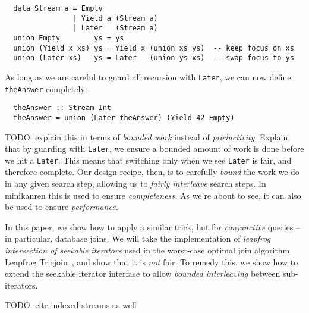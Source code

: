 \documentclass[acmsmall,screen,review,anonymous,dvipsnames]{acmart}
\newcommand\todo[1]{{\color{Orange}#1}}
\begin{document}

\begin{verbatim}
  data Stream a = Empty
                | Yield a (Stream a)
                | Later   (Stream a)
  union Empty        ys = ys
  union (Yield x xs) ys = Yield x (union xs ys)  -- keep focus on xs
  union (Later xs)   ys = Later   (union ys xs)  -- swap focus to ys
\end{verbatim}

\noindent
As long as we are careful to guard all recursion with \texttt{Later}, we can now define \texttt{theAnswer} completely:

\begin{verbatim}
  theAnswer :: Stream Int
  theAnswer = union (Later theAnswer) (Yield 42 Empty)
\end{verbatim}

\noindent
\todo{%
  TODO: explain this in terms of \emph{bounded work} instead of \emph{productivity}.
  Explain that by guarding with \texttt{Later}, we ensure a bounded amount of work is done before we hit a \texttt{Later}.
  This means that switching only when we see \texttt{Later} is fair, and therefore complete.
  Our design recipe, then, is to carefully \emph{bound} the work we do in any given search step, allowing us to \emph{fairly interleave} search steps.
  In minikanren this is used to ensure \emph{completeness.}
  As we're about to see, it can also be used to ensure \emph{performance.}
}


In this paper, we show how to apply a similar trick, but for \emph{conjunctive} queries -- in particular, database joins.
We will take the implementation of \emph{leapfrog intersection of seekable iterators} used in the worst-case optimal join algorithm Leapfrog Triejoin~\citep{lftj}, and show that it is \emph{not} fair.
To remedy this, we show how to extend the seekable iterator interface to allow \emph{bounded interleaving} between sub-iterators.

\todo{TODO: cite indexed streams as well}


\end{document}
